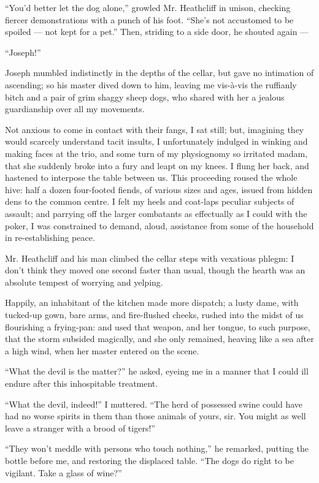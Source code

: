 \par “You'd better let the dog alone,” growled Mr. Heathcliff in unison, checking fiercer demonstrations with a punch of his foot. “She's not accustomed to be spoiled — not kept for a pet.” Then, striding to a side door, he shouted again —
\par “Joseph!”
\par Joseph mumbled indistinctly in the depths of the cellar, but gave no intimation of ascending; so his master dived down to him, leaving me vis-à-vis the ruffianly bitch and a pair of grim shaggy sheep dogs, who shared with her a jealous guardianship over all my movements.
\par Not anxious to come in contact with their fangs, I sat still; but, imagining they would scarcely understand tacit insults, I unfortunately indulged in winking and making faces at the trio, and some turn of my physiognomy so irritated madam, that she suddenly broke into a fury and leapt on my knees. I flung her back, and hastened to interpose the table between us. This proceeding roused the whole hive: half a dozen four-footed fiends, of various sizes and ages, issued from hidden dens to the common centre. I felt my heels and coat-laps peculiar subjects of assault; and parrying off the larger combatants as effectually as I could with the poker, I was constrained to demand, aloud, assistance from some of the household in re-establishing peace.
\par Mr. Heathcliff and his man climbed the cellar steps with vexatious phlegm: I don't think they moved one second faster than usual, though the hearth was an absolute tempest of worrying and yelping.
\par Happily, an inhabitant of the kitchen made more dispatch; a lusty dame, with tucked-up gown, bare arms, and fire-flushed cheeks, rushed into the midst of us flourishing a frying-pan: and used that weapon, and her tongue, to such purpose, that the storm subsided magically, and she only remained, heaving like a sea after a high wind, when her master entered on the scene.
\par “What the devil is the matter?” he asked, eyeing me in a manner that I could ill endure after this inhospitable treatment.
\par “What the devil, indeed!” I muttered. “The herd of possessed swine could have had no worse spirits in them than those animals of yours, sir. You might as well leave a stranger with a brood of tigers!”
\par “They won't meddle with persons who touch nothing,” he remarked, putting the bottle before me, and restoring the displaced table. “The dogs do right to be vigilant. Take a glass of wine?”
